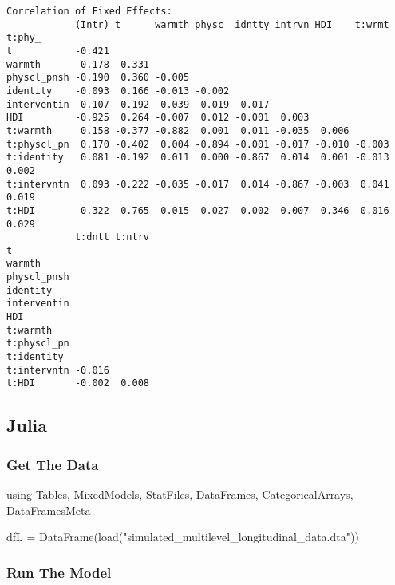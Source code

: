 \documentclass[
  letterpaper,
  DIV=11,
  numbers=noendperiod]{scrreprt}
\newenvironment{Shaded}{\begin{snugshade}}{\end{snugshade}}
\newcommand{\BuiltInTok}[1]{\textcolor[rgb]{0.00,0.23,0.31}{#1}}
\newcommand{\FunctionTok}[1]{\textcolor[rgb]{0.28,0.35,0.67}{#1}}
\newcommand{\ImportTok}[1]{\textcolor[rgb]{0.00,0.46,0.62}{#1}}
\newcommand{\NormalTok}[1]{\textcolor[rgb]{0.00,0.23,0.31}{#1}}
\newcommand{\OperatorTok}[1]{\textcolor[rgb]{0.37,0.37,0.37}{#1}}
\newcommand{\StringTok}[1]{\textcolor[rgb]{0.13,0.47,0.30}{#1}}
\begin{document}
\begin{verbatim}
Correlation of Fixed Effects:
            (Intr) t      warmth physc_ idntty intrvn HDI    t:wrmt t:phy_
t           -0.421                                                        
warmth      -0.178  0.331                                                 
physcl_pnsh -0.190  0.360 -0.005                                          
identity    -0.093  0.166 -0.013 -0.002                                   
interventin -0.107  0.192  0.039  0.019 -0.017                            
HDI         -0.925  0.264 -0.007  0.012 -0.001  0.003                     
t:warmth     0.158 -0.377 -0.882  0.001  0.011 -0.035  0.006              
t:physcl_pn  0.170 -0.402  0.004 -0.894 -0.001 -0.017 -0.010 -0.003       
t:identity   0.081 -0.192  0.011  0.000 -0.867  0.014  0.001 -0.013  0.002
t:intervntn  0.093 -0.222 -0.035 -0.017  0.014 -0.867 -0.003  0.041  0.019
t:HDI        0.322 -0.765  0.015 -0.027  0.002 -0.007 -0.346 -0.016  0.029
            t:dntt t:ntrv
t                        
warmth                   
physcl_pnsh              
identity                 
interventin              
HDI                      
t:warmth                 
t:physcl_pn              
t:identity               
t:intervntn -0.016       
t:HDI       -0.002  0.008
\end{verbatim}

\subsection{Julia}

\subsubsection{Get The Data}\label{get-the-data-5}

\begin{Shaded}
\begin{Highlighting}[]
\ImportTok{using} \BuiltInTok{Tables}\NormalTok{, }\BuiltInTok{MixedModels}\NormalTok{, }\BuiltInTok{StatFiles}\NormalTok{, }\BuiltInTok{DataFrames}\NormalTok{, }\BuiltInTok{CategoricalArrays}\NormalTok{, }\BuiltInTok{DataFramesMeta}

\NormalTok{dfL }\OperatorTok{=} \FunctionTok{DataFrame}\NormalTok{(}\FunctionTok{load}\NormalTok{(}\StringTok{"simulated\_multilevel\_longitudinal\_data.dta"}\NormalTok{))}
\end{Highlighting}
\end{Shaded}

\subsubsection{Run The Model}\label{run-the-model-5}
\end{document}
